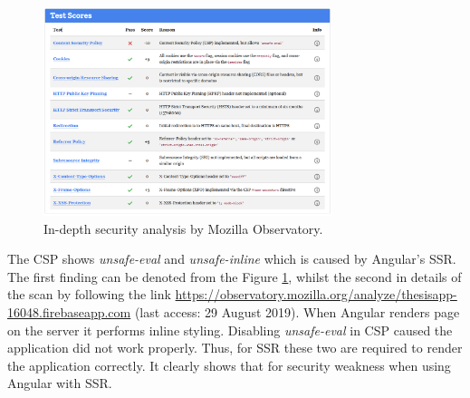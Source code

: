 \documentclass{article} %
\begin{document}
\begin{figure}[ht]
  \centering
      \includegraphics[width=0.75\textwidth]{observatory2.png}
  \caption{In-depth security analysis by Mozilla Observatory.}
  \label{fig:observatory2}
\end{figure}
\newpage
The CSP shows \textit{unsafe-eval} and \textit{unsafe-inline} which is caused by Angular's SSR. The first finding can be denoted from the Figure \ref{fig:observatory2}, whilst the second in details of the scan by following the link \url{https://observatory.mozilla.org/analyze/thesisapp-16048.firebaseapp.com} (last access: 29 August 2019). When Angular renders page on the server it performs inline styling. Disabling \textit{unsafe-eval} in CSP caused the application did not work properly. Thus, for SSR these two are required to render the application correctly. It clearly shows that for security weakness when using Angular with SSR.
\newpage
\end{document}
